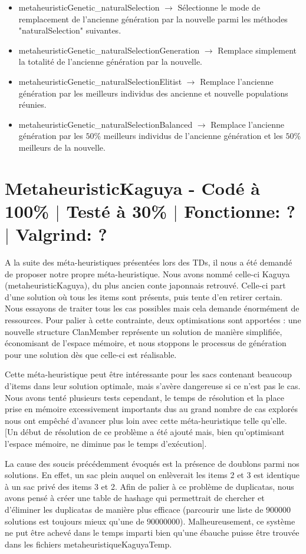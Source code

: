 \documentclass{EPUProjetPeiP}
\newcommand{\comp}[5]{
	\section[#1]{#1 {\small - Codé à #2\% $\vert$ Testé à #3\% $\vert$ Fonctionne: #4 $\vert$ Valgrind: #5}}
}
\begin{document}
\begin{itemize}
	\item metaheuristicGenetic\_naturalSelection $\longrightarrow$ Sélectionne le mode de remplacement de l'ancienne génération par la nouvelle parmi les méthodes "naturalSelection" suivantes.
	\item metaheuristicGenetic\_naturalSelectionGeneration $\longrightarrow$ Remplace simplement la totalité de l'ancienne génération par la nouvelle.
	\item metaheuristicGenetic\_naturalSelectionElitist $\longrightarrow$ Remplace l'ancienne génération par les meilleurs individus des ancienne et nouvelle populations réunies.
	\item metaheuristicGenetic\_naturalSelectionBalanced $\longrightarrow$ Remplace l'ancienne génération par les $50\%$ meilleurs individus de l'ancienne génération et les $50\%$ meilleurs de la nouvelle.
\end{itemize}

\comp{MetaheuristicKaguya}{100}{30}{?}{?}
A la suite des méta-heuristiques présentées lors des TDs, il nous a été demandé de proposer notre propre méta-heuristique. Nous avons nommé celle-ci Kaguya (metaheuristicKaguya), du plus ancien conte japonnais retrouvé. Celle-ci part d'une solution où tous les items sont présents, puis tente d'en retirer certain.
Nous essayons de traiter tous les cas possibles mais cela demande énormément de ressources. Pour palier à cette contrainte, deux optimisations sont apportées : une nouvelle structure ClanMember représente un solution de manière simplifiée, économisant de l'espace mémoire, et nous stoppons le processus de génération pour une solution dès que celle-ci est réalisable.

Cette méta-heuristique peut être intéressante pour les sacs contenant beaucoup d'items dans leur solution optimale, mais s'avère dangereuse si ce n'est pas le cas. Nous avons tenté plusieurs tests cependant, le temps de résolution et la place prise en mémoire excessivement importants dus au grand nombre de cas explorés nous ont empêché d'avancer plus loin avec cette méta-heuristique telle qu'elle. [Un début de résolution de ce problème a été ajouté mais, bien qu'optimisant l'espace mémoire, ne diminue pas le temps d'exécution].

La cause des soucis précédemment évoqués est la présence de doublons parmi nos solutions. En effet, un sac plein auquel on enlèverait les items 2 et 3 est identique à un sac privé des items 3 et 2. Afin de palier à ce problème de duplicatas, nous avons pensé à créer une table de hashage qui permettrait de chercher et d'éliminer les duplicatas de manière plus efficace (parcourir une liste de $900 000$ solutions est toujours mieux qu'une de $90 000 000$). Malheureusement, ce système ne put être achevé dans le temps imparti bien qu'une ébauche puisse être trouvée dans les fichiers metaheuristiqueKaguyaTemp.
\end{document}
